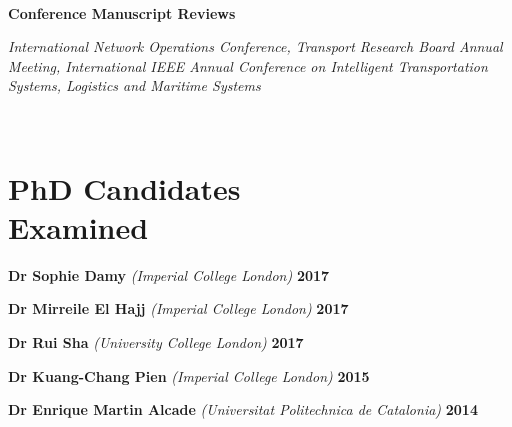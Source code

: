 \documentclass[margin]{res}
\begin{document}
\begin{resume}
\begin{minipage}{\textwidth}
\begin{minipage}{\textwidth}
	\end{minipage}
	\end{minipage}
	\\
	\begin{minipage}{\textwidth}
	{\bf Conference Manuscript Reviews} \\
	\vspace{0.1in}
	\begin{minipage}{\textwidth}
	\setlength{\leftskip}{0.2in}
	\textit{
International Network Operations Conference, Transport Research Board Annual Meeting, International IEEE Annual Conference on Intelligent Transportation Systems, Logistics and Maritime Systems	}
	\end{minipage}
	\end{minipage}
	\\

\vspace{-0.15in}
\section{\sc PhD Candidates\\ Examined}
	\begin{minipage}{\textwidth}
	{\bf Dr Sophie Damy} \textit{(Imperial College London)} \hfill {\bf 2017}
	\vspace{0.03in}
	\end{minipage}
	\begin{minipage}{\textwidth}
	{\bf Dr Mirreile El Hajj} \textit{(Imperial College London)} \hfill {\bf 2017}
	\vspace{0.03in}
	\end{minipage}
	\begin{minipage}{\textwidth}
	{\bf Dr Rui Sha} \textit{(University College London)} \hfill {\bf 2017}
	\vspace{0.03in}
	\end{minipage}
	\begin{minipage}{\textwidth}
	{\bf Dr Kuang-Chang Pien} \textit{(Imperial College London)} \hfill {\bf 2015}
	\vspace{0.03in}
	\end{minipage}
	\begin{minipage}{\textwidth}
	{\bf Dr Enrique Martin Alcade} \textit{(Universitat Politechnica de Catalonia)} \hfill {\bf 2014}
	\vspace{0.03in}
	\end{minipage}


\end{resume}
\end{document}
